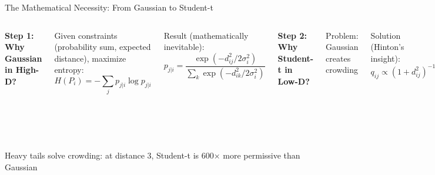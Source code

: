\documentclass[aspectratio=169]{beamer}
\begin{document}
\begin{frame}{The Mathematical Necessity: From Gaussian to Student-t}
\begin{columns}
\textbf{Step 1: Why Gaussian in High-D?}

Given constraints (probability sum, expected distance), maximize entropy:
$$H(P_i) = -\sum_j p_{j|i}\log p_{j|i}$$

Result (mathematically inevitable):
$$p_{j|i} = \frac{\exp(-d_{ij}^2/2\sigma_i^2)}{\sum_k \exp(-d_{ik}^2/2\sigma_i^2)}$$

\vspace{0.3cm}
\textbf{Step 2: Why Student-t in Low-D?}

Problem: Gaussian creates crowding


\vspace{0.2cm}
Solution (Hinton's insight):
$$q_{ij} \propto (1 + d_{ij}^2)^{-1}$$

\textbf{Why df=1?} Polynomial decay creates "virtual space" for moderate distances
\end{columns}

\vspace{0.3cm}
\colorbox{green!20}{\parbox{0.95\textwidth}{\centering Heavy tails solve crowding: at distance 3, Student-t is 600× more permissive than Gaussian}}
\end{frame}
\end{document}
